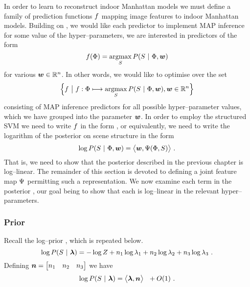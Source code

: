 In order to learn to reconstruct indoor Manhattan models we must
define a family of prediction functions $\Predictor$ mapping image
features to indoor Manhattan models. Building on ,
we would like each predictor to implement MAP inference for some
value of the hyper--parameters, \ie we are interested in predictors of
the form
\begin{equation}
  \label{eq:map-predictor}
  \Predictor(\Features) = 
  \argmax_{\Seam}\limits P(\Seam ~|~ \Features,\Model)
\end{equation}
for various $\Model\in\Reals^n$. In other words, we would like to
optimise over the set
\begin{equation}
  \Bigl\{ 
    \Predictor ~\bigl|~
    \Predictor: \Features \longmapsto 
    \argmax_{\Seam}\limits P(\Seam ~|~ \Features,\Model), \Model\in\Reals^n
  \Bigr\}
\end{equation}
consisting of MAP inference predictors for all possible
hyper--parameter values, which we have grouped into the parameter
$\Model$. In order to employ the structured SVM we need to write
$\Predictor$ in the form , or equivalently, we need
to write the logarithm of the posterior on scene structure in the form
\begin{equation}
  \log P(\Seam ~|~ \Features,\Model)
  =
  \bigl\langle \Model, \JointFtr(\Features,\Seam) \bigr\rangle ~.
\end{equation}
That is, we need to show that the posterior described in the previous
chapter is log--linear. The remainder of this section is devoted to
defining a joint feature map $\JointFtr$ permitting such a
representation. We now examine each term in the posterior
, our goal being to show that each is
log--linear in the relevant hyper--parameters.

\subsubsection{Prior}
Recall the log--prior , which is repeated
below.
\begin{equation}
  \label{eq:log-scene-prior2}
  \log P(\Seam ~|~ \Penalties) =
    -\log Z +
    n_1\log\PenaltyConc + 
    n_2\log\PenaltyConv + 
    n_3\log\PenaltyOccl~.
\end{equation}
Defining $\Counts=\begin{bmatrix}n_1&n_2&n_3\end{bmatrix}$ we have
\begin{equation}
  \label{eq:linear-prior}
  \log P(\Seam ~|~ \Penalties) 
  =
  \bigl\langle \Penalties, \Counts \bigr\rangle ~~ + O(1) ~.
\end{equation}

